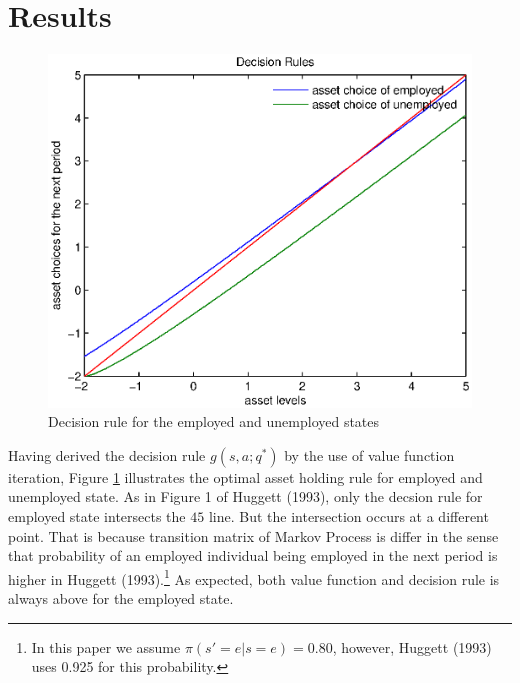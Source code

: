 \documentclass[a4paper,10pt,12pt]{article}%
\begin{document}
\section*{Results}

\begin{figure}[H]
\centering
   \includegraphics[scale=1]{assetchoice.eps} 
  \begin{center}
   \caption{Decision rule for the employed and unemployed states }
   \label{apolicy}
  \end{center}
\end{figure}
Having derived the decision rule $g(s,a;q^*)$ by the use of value function iteration, Figure \ref{apolicy} illustrates the optimal asset holding rule for employed and unemployed state. As in Figure 1 of Huggett (1993), only the decsion rule for employed state intersects the $45$ line. But the intersection occurs at a different point. That is because transition matrix of Markov Process is differ in the sense that probability of an employed individual being employed in the next period is higher in Huggett (1993).\footnote{In this paper we assume $\pi(s'=e|s=e)=0.80$, however, Huggett (1993) uses 0.925 for this probability.} As expected, both value function and decision rule is always above for the employed state.
\end{document}
